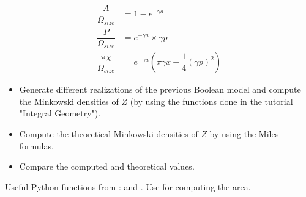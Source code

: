 \begin{align}
\dfrac{A}{\Omega_{size}} & = 1-e^{-\gamma a}\\
\dfrac{P}{\Omega_{size}} & = e^{-\gamma a}\times \gamma p\\
\dfrac{\pi \chi}{\Omega_{size}} & = e^{-\gamma a} \left( \pi\gamma x - \dfrac{1}{4}(\gamma p)^2 \right)
\end{align}
\vspace*{-8pt}
\begin{qbox}
\begin{itemize}
\item Generate different realizations of the previous Boolean model and compute the Minkowski densities of $Z$ (by using the functions done in the tutorial "Integral Geometry").
\item Compute the theoretical Minkowski densities of $Z$ by using the Miles formulas.
\item Compare the computed and theoretical values. 
\end{itemize}
\end{qbox}

\begin{pcomment}
 \begin{premark}
  Useful Python functions from :  and . Use  for computing the area.
 \end{premark}

\end{pcomment}
